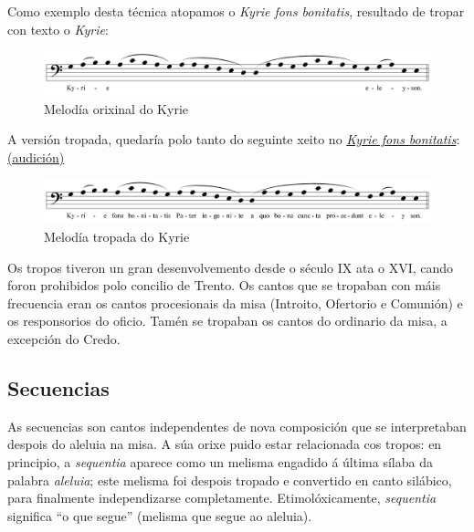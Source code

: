 \documentclass[a4paper, twoside]{templates/ociamthesis}
\begin{document}
Como exemplo desta técnica atopamos o \emph{Kyrie fons bonitatis}, resultado de tropar con texto o \emph{Kyrie}:

\begin{figure}[ht]

{\centering \includegraphics[width=1\linewidth]{figures/ud-03/Kyrie-1} 

}

\caption[Melodía do *Kyrie*]{Melodía orixinal do Kyrie}\label{fig:kyrie-1}
\end{figure}

A versión tropada, quedaría polo tanto do seguinte xeito no \href{https://es.wikipedia.org/wiki/Kyrie_eleison}{\emph{Kyrie fons bonitatis}}: \href{https://open.spotify.com/track/74ztOxzqhvEStzW4pqZII0?si=fbe1ed03f9bf4d6c}{(audición)}

\begin{figure}[ht]

{\centering \includegraphics[width=1\linewidth]{figures/ud-03/Kyrie-fons-bonitatis} 

}

\caption[Melodía tropada do Kyrie fons bonitatis]{Melodía tropada do Kyrie}\label{fig:kyrie-fons-bonitatis}
\end{figure}

Os tropos tiveron un gran desenvolvemento desde o século IX ata o XVI, cando foron prohibidos polo concilio de Trento. Os cantos que se tropaban con máis frecuencia eran os cantos procesionais da misa (Introito, Ofertorio e Comunión) e os responsorios do oficio. Tamén se tropaban os cantos do ordinario da misa, a excepción do Credo.

\hypertarget{secuencias}{%
\subsection{Secuencias}\label{secuencias}}

As secuencias son cantos independentes de nova composición que se interpretaban despois do aleluia na misa. A súa orixe puido estar relacionada cos tropos: en principio, a \emph{sequentia} aparece como un melisma engadido á última sílaba da palabra \emph{aleluia}; este melisma foi despois tropado e convertido en canto silábico, para finalmente independizarse completamente. Etimolóxicamente, \emph{sequentia} significa ``o que segue'' (melisma que segue ao aleluia).
\end{document}

